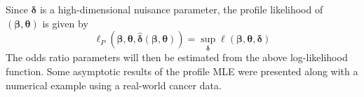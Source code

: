 \documentclass[11pt]{article}
\begin{document}
Since $\mathbf{\delta}$ is a high-dimensional nuisance parameter, the profile likelihood of $(\mathbf{\beta}, \mathbf{\theta})$ is given by
$$
\ell_P(\mathbf{\beta}, \mathbf{\theta}, \hat{\mathbf{\delta}}(\mathbf{\beta},\mathbf{\theta})) = \sup_{\mathbf{\delta}}\ell(\mathbf{\beta}, \mathbf{\theta}, \mathbf{\delta})
$$
The odds ratio parameters will then be estimated from the above log-likelihood function. Some asymptotic results of the profile MLE were presented along with a numerical example using a real-world cancer data.
\end{document}
